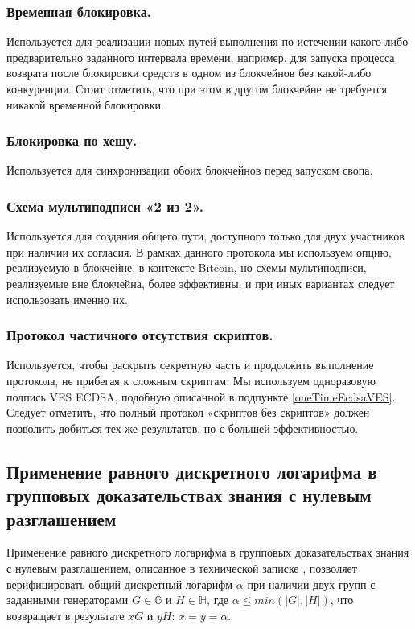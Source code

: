 \documentclass{llncs}
\newcommand{\GG}{\mathbb{G}}
\newcommand{\HH}{\mathbb{H}}
\begin{document}
\subsubsection{Временная блокировка.}
Используется для реализации новых путей выполнения по истечении какого-либо предварительно заданного интервала времени, например, для запуска процесса возврата после блокировки средств в одном из блокчейнов без какой-либо конкуренции. Стоит отметить, что при этом в другом блокчейне не требуется никакой временной блокировки.

\subsubsection{Блокировка по хешу.}
Используется для синхронизации обоих блокчейнов перед запуском свопа.

\subsubsection{Схема мультиподписи «2 из 2».}
Используется для создания общего пути, доступного только для двух участников при наличии их согласия. В рамках данного протокола мы используем опцию, реализуемую в блокчейне, в контексте Bitcoin, но схемы мультиподписи, реализуемые вне блокчейна, более эффективны, и при иных вариантах следует использовать именно их.

\subsubsection{Протокол частичного отсутствия скриптов.}
Используется, чтобы раскрыть секретную часть и продолжить выполнение протокола, не прибегая к сложным скриптам. Мы используем одноразовую подпись VES ECDSA, подобную описанной в подпункте \ref{oneTimeEcdsaVES}. Следует отметить, что полный протокол «скриптов без скриптов» \cite{poelstra-adaptor} должен позволить добиться тех же результатов, но с большей эффективностью.

\subsection{Применение равного дискретного логарифма в групповых доказательствах знания с нулевым разглашением}
Применение равного дискретного логарифма в групповых доказательствах знания с нулевым разглашением, описанное в технической записке \cite{MRL0010}, позволяет верифицировать общий дискретный логарифм $\alpha$ при наличии двух групп с заданными генераторами $G \in \GG$ и $H \in \HH$, где $\alpha \leq min(|G|,|H|)$, что возвращает в результате $xG$ и $yH$: $x=y=\alpha$.
\end{document}
